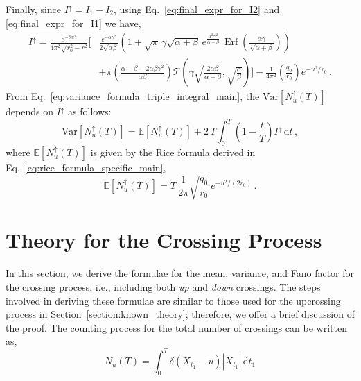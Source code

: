 \documentclass[journal]{IEEEtran}
\theoremstyle{plain}
\theoremstyle{definition}
\theoremstyle{remark}
\newcommand{\E}{\mathbb{E}}
\newcommand{\Ot}{\mathcal{T}}
\newcommand{\Erf}{\operatorname{Erf}}
\newcommand{\Iup}{I^\uparrow}
\newcommand{\Nu}{N_u(T)}
\newcommand{\Nup}{N_u^{\uparrow}(T)}
\newcommand{\dd}{\mathrm{d}}
\newcommand{\Var}{\text{Var}}
\begin{document}
Finally, since $\Iup=I_1-I_2$, using Eq.~\eqref{eq:final_expr_for_I2} and \eqref{eq:final_expr_for_I1} we have,
\begin{equation}
\begin{aligned}
    \Iup = \frac{e^{-\delta\,u^2}}{4\pi^2 \sqrt{r_0^2-r^2}} \Biggl[&\frac{e^{-\alpha \gamma^2}}{2\sqrt{\alpha\beta}} \left(1 + \sqrt{\pi} \, \gamma \sqrt{\alpha + \beta} \, e^{\frac{\alpha^2 \gamma^2}{\alpha + \beta}} \, \Erf\left(\frac{\alpha \gamma}{\sqrt{\alpha + \beta}}\right)\right)  \\& + \pi \left(\frac{\alpha - \beta - 2\alpha\beta\gamma^2}{\alpha\beta}\right) \Ot\left(\gamma\sqrt{\frac{2\alpha\beta}{\alpha+\beta}}, \sqrt{\frac{\alpha}{\beta}}\right)\Biggr] - \frac{1}{4\pi^2 }\left(\frac{q_0}{r_0}\right)e^{-u^2/r_0} \,.
\end{aligned} \label{eq:I_final_result_owensT}
\end{equation}
From Eq.~\eqref{eq:variance_formula_triple_integral_main}, the $\Var\left[\Nup\right]$ depends on $\Iup$ as follows:
\begin{equation}
    \Var\left[\Nup\right] = \E\left[\Nup\right] + 2\,T \int_{0}^T \left(1-\frac{t}{T}\right) \Iup \, \dd t\,, \label{eq:var_in_terms_of_I}
\end{equation}
where $\E\left[\Nup\right]$ is given by the Rice formula derived in Eq.~\eqref{eq:rice_formula_specific_main},
\begin{equation}
    \E\left[\Nup\right] = T\, \frac{1}{2\pi}\sqrt{\frac{q_0}{r_0}} \, e^{-u^2/(2r_0)} \,.
\end{equation}


\section{Theory for the Crossing Process}
\label{section:crossings}
In this section, we derive the formulae for the mean, variance, and Fano factor for the crossing process, i.e., including both \textit{up} and \textit{down} crossings. The steps involved in deriving these formulae are similar to those used for the upcrossing process in Section~\ref{section:known_theory}; therefore, we offer a brief discussion of the proof. The counting process for the total number of crossings can be written as,
\begin{equation}
    \Nu = \int_0^T \delta\left(X_{t_1} - u\right) \left|\dot{X}_{t_1}\right| \, \dd t_1 \label{eq:defn_Nu_delta_crossing}
\end{equation}
\end{document}
